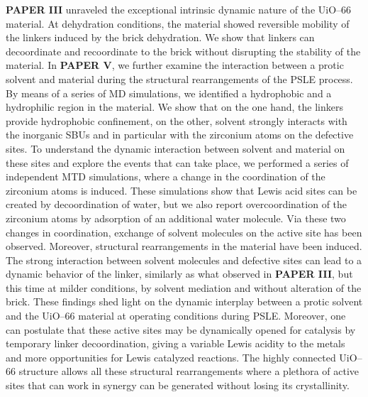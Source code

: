 \textbf{PAPER III} unraveled the exceptional intrinsic dynamic nature of the UiO--66 material. At dehydration conditions, the material showed reversible mobility of the linkers induced by the brick dehydration. We show that linkers can decoordinate and recoordinate to the brick without disrupting the stability of the material. In \textbf{PAPER V}, we further examine the interaction between a protic solvent and material during the structural rearrangements of the PSLE process. By means of a series of MD simulations, we identified a hydrophobic and a hydrophilic region in the material. We show that on the one hand, the linkers provide hydrophobic confinement, on the other, solvent strongly interacts with the inorganic SBUs and in particular with the zirconium atoms on the defective sites. To understand the dynamic interaction between solvent and material on these sites and explore the events that can take place, we performed a series of independent MTD simulations, where a change in the coordination of the zirconium atoms is induced. These simulations show that Lewis acid sites can be created by decoordination of water, but we also report overcoordination of the zirconium atoms by adsorption of an additional water molecule. Via these two changes in coordination, exchange of solvent molecules on the active site has been observed. Moreover, structural rearrangements in the material have been induced. The strong interaction between solvent molecules and defective sites can lead to a dynamic behavior of the linker, similarly as what observed in \textbf{PAPER III}, but this time at milder conditions, by solvent mediation and without alteration of the brick. These findings shed light on the dynamic interplay between a protic solvent and the UiO--66 material at operating conditions during PSLE. Moreover, one can postulate that these active sites may be dynamically opened for catalysis by temporary linker decoordination, giving a variable Lewis acidity to the metals and more opportunities for Lewis catalyzed reactions. The highly connected UiO--66 structure allows all these structural rearrangements where a plethora of active sites that can work in synergy can be generated without losing its crystallinity.
\npar
